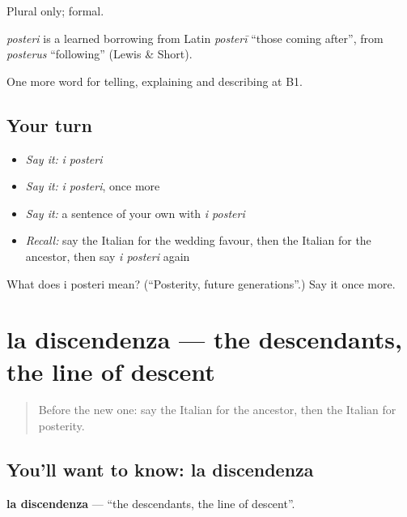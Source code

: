 Plural only; formal.

\begin{cousinweb}
\emph{posteri} is a learned borrowing from Latin \emph{posterī} \textquotedblleft{}those coming after\textquotedblright{}, from \emph{posterus} \textquotedblleft{}following\textquotedblright{} (Lewis \& Short).
\end{cousinweb}

\begin{grammarlens}[title={What you've built}]
One more word for telling, explaining and describing at B1.
\end{grammarlens}

\subsection*{Your turn}
\begin{itemize}
\raggedright
  \item \emph{Say it:} \emph{i posteri}
  \item \emph{Say it:} \emph{i posteri}, once more
  \item \emph{Say it:} a sentence of your own with \emph{i posteri}
  \item \emph{Recall:} say the Italian for the wedding favour, then the Italian for the ancestor, then say \emph{i posteri} again
\end{itemize}

\begin{tcolorbox}[breakable,colback=teal!4,colframe=teal!35!black,title={Before you move on}]
What does i posteri mean? (\textquotedblleft{}Posterity, future generations\textquotedblright{}.) Say it once more.
\end{tcolorbox}
\section[la discendenza]{la discendenza — the descendants, the line of descent}

\label{lesson:IT-C312-discendenza}



\begin{quote}
Before the new one: say the Italian for the ancestor, then the Italian for posterity.
\end{quote}

\subsection*{You'll want to know: la discendenza}
\textbf{la discendenza} — \textquotedblleft{}the descendants, the line of descent\textquotedblright{}.

